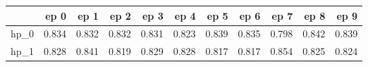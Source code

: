 \begin{tabular}{lrrrrrrrrrr}
\toprule
{} &   ep 0 &   ep 1 &   ep 2 &   ep 3 &   ep 4 &   ep 5 &   ep 6 &   ep 7 &   ep 8 &   ep 9 \\
\midrule
hp\_0 &  0.834 &  0.832 &  0.832 &  0.831 &  0.823 &  0.839 &  0.835 &  0.798 &  0.842 &  0.839 \\
hp\_1 &  0.828 &  0.841 &  0.819 &  0.829 &  0.828 &  0.817 &  0.817 &  0.854 &  0.825 &  0.824 \\
\bottomrule
\end{tabular}
